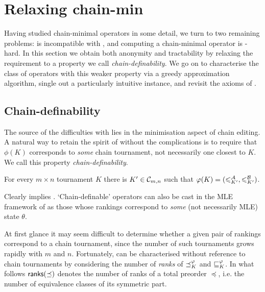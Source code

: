 \section{Relaxing chain-min}
\label{tourn_sec_relaxing_chain_min}

Having studied chain-minimal operators in some detail, we turn to two remaining
problems:  is incompatible with , and
computing a chain-minimal operator is -hard. In this
section we obtain both anonymity and tractability by relaxing the
 requirement to a property we call
\emph{chain-definability}. We go on to characterise the class of operators with
this weaker property via a greedy approximation algorithm, single out a
particularly intuitive instance, and revisit the axioms of
.

\subsection{Chain-definability}

The source of the difficulties with  lies in the
minimisation aspect of chain editing. A natural way to retain the spirit of
 without the complications is to require that $\phi(K)$
corresponds to \emph{some} chain tournament, not necessarily one closest to
$K$. We call this property \emph{chain-definability}.

\begin{axiom}
    For every $m \times n$ tournament $K$ there is $K' \in \mathcal{C}_{m,n}$ such that
    $\varphi(K) = ({\leqslant^{\mathcal{A}}_{K'}}, {\leqslant^{\mathcal{B}}_{K'}})$.
\end{axiom}

Clearly  implies . `Chain-definable'
operators can also be cast in the MLE framework of  as those
whose rankings correspond to \emph{some} (not necessarily MLE) state $\theta$.

At first glance it may seem difficult to determine whether a given pair of
rankings correspond to a chain tournament, since the number of such tournaments
grows rapidly with $m$ and $n$.
%
Fortunately,  can be characterised without reference to
chain tournaments by considering the number of \emph{ranks} of ${\preceq_K^\varphi}$
and ${\sqsubseteq_K^\varphi}$. In what follows $\mathsf{ranks}({\preceq})$ denotes the number of
ranks of a total preorder $\preceq$, i.e. the number of equivalence classes of
its symmetric part.

